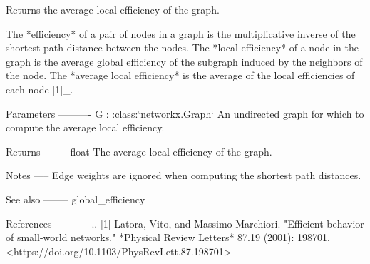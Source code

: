 \begin{DoxyVerb}Returns the average local efficiency of the graph.

The *efficiency* of a pair of nodes in a graph is the multiplicative
inverse of the shortest path distance between the nodes. The *local
efficiency* of a node in the graph is the average global efficiency of the
subgraph induced by the neighbors of the node. The *average local
efficiency* is the average of the local efficiencies of each node [1]_.

Parameters
----------
G : :class:`networkx.Graph`
    An undirected graph for which to compute the average local efficiency.

Returns
-------
float
    The average local efficiency of the graph.

Notes
-----
Edge weights are ignored when computing the shortest path distances.

See also
--------
global_efficiency

References
----------
.. [1] Latora, Vito, and Massimo Marchiori.
       "Efficient behavior of small-world networks."
       *Physical Review Letters* 87.19 (2001): 198701.
       <https://doi.org/10.1103/PhysRevLett.87.198701>\end{DoxyVerb}
 